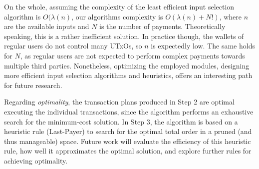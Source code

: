 On the whole, assuming the complexity of the least efficient input selection
algorithm is $O(\lambda(n)$, our algorithms complexity is $O(\lambda(n) + N!)$,
where $n$ are the available inputs and $N$ is the number of payments.
Theoretically speaking, this is a rather inefficient solution. In practice
though, the wallets of regular users do not control many UTxOs, so $n$ is
expectedly low. The same holds for $N$, as regular users are not expected to
perform complex payments towards multiple third parties.  Nonetheless,
optimizing the employed modules, \eg designing more efficient input selection
algorithms and heuristics, offers an interesting path for future research.

Regarding \emph{optimality}, the transaction plans produced in Step 2 are
optimal \wrt executing the individual transactions, since the algorithm
performs an exhaustive search for the minimum-cost solution. In Step 3, the
algorithm is based on a heuristic rule (Last-Payer) to search for the optimal
total order in a pruned (and thus manageable) space.  Future work will evaluate
the efficiency of this heuristic rule, \ie how well it approximates the optimal
solution, and explore further rules for achieving optimality.
